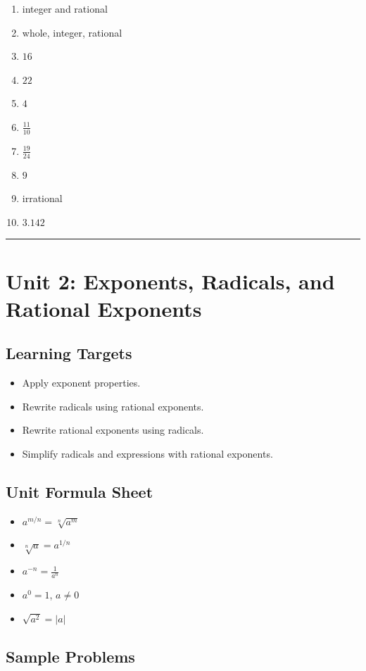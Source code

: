 \documentclass[11pt]{book}
\begin{document}
\begin{enumerate}
\item integer and rational
\item whole, integer, rational
\item \(16\)
\item \(22\)
\item \(4\)
\item \(\frac{11}{10}\)
\item \(\frac{19}{24}\)
\item \(9\)
\item irrational
\item \(3.142\)
\end{enumerate}

\bigskip\hrule\bigskip

\chapter{Unit 2: Exponents, Radicals, and Rational Exponents}

\section{Learning Targets}

\begin{itemize}
\item Apply exponent properties.
\item Rewrite radicals using rational exponents.
\item Rewrite rational exponents using radicals.
\item Simplify radicals and expressions with rational exponents.
\end{itemize}

\section{Unit Formula Sheet}

\begin{itemize}
\item \(a^{m/n}=\sqrt[n]{a^m}\)
\item \(\sqrt[n]{a}=a^{1/n}\)
\item \(a^{-n}=\frac1{a^n}\)
\item \(a^0=1\), \(a\ne0\)
\item \(\sqrt{a^2}=|a|\)
\end{itemize}

\section{Sample Problems}
\end{document}
